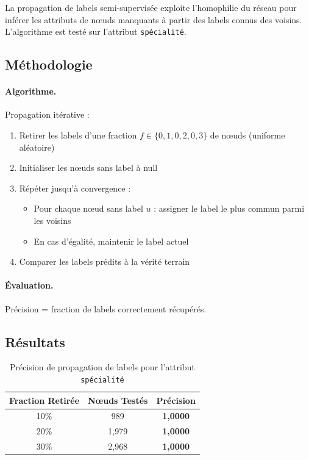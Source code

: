 \documentclass[12pt,a4paper]{article}
\begin{document}
La propagation de labels semi-supervisée exploite l'homophilie du réseau pour inférer les attributs de nœuds manquants à partir des labels connus des voisins. L'algorithme est testé sur l'attribut \texttt{spécialité}.

\subsection{Méthodologie}

\paragraph{Algorithme.} Propagation itérative :
\begin{enumerate}
    \item Retirer les labels d'une fraction $f \in \{0,1, 0,2, 0,3\}$ de nœuds (uniforme aléatoire)
    \item Initialiser les nœuds sans label à null
    \item Répéter jusqu'à convergence :
    \begin{itemize}
        \item Pour chaque nœud sans label $u$ : assigner le label le plus commun parmi les voisins
        \item En cas d'égalité, maintenir le label actuel
    \end{itemize}
    \item Comparer les labels prédits à la vérité terrain
\end{enumerate}

\paragraph{Évaluation.} Précision = fraction de labels correctement récupérés.

\subsection{Résultats}

\begin{table}[H]
\centering
\caption{Précision de propagation de labels pour l'attribut \texttt{spécialité}}
\label{tab:q5_results}
\begin{tabular}{@{}ccc@{}}
\toprule
\textbf{Fraction Retirée} & \textbf{Nœuds Testés} & \textbf{Précision} \\
\midrule
10\% & 989 & \textbf{1,0000} \\
20\% & 1,979 & \textbf{1,0000} \\
30\% & 2,968 & \textbf{1,0000} \\
\bottomrule
\end{tabular}
\end{table}
\end{document}
